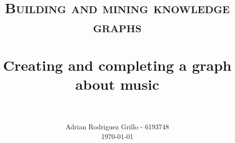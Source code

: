 \documentclass[12pt,a4paper]{article}
\title{
		\usefont{OT1}{bch}{b}{n}
		\normalfont \normalsize \textsc{Building and mining knowledge graphs} \\ [25pt]
		\horrule{0.5pt} \\[0.4cm]
		\huge Creating and completing a graph about music \\
		\horrule{2pt} \\[0.5cm]
}
\author{
		\normalfont 								\normalsize
        Adrian Rodriguez Grillo - 6193748\\[-3pt]		\normalsize
        \today
}
\date{}
\numberwithin{equation}{section}	%
\numberwithin{figure}{section}		%
\numberwithin{table}{section}		%
\begin{document}
\maketitle












{\tiny\printbibliography}
\end{document}
